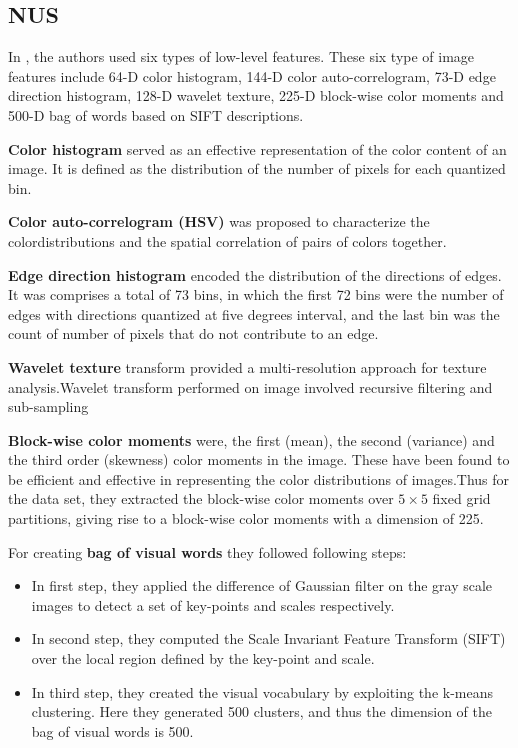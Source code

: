 \subsection{NUS}

In \citet*{NUS}, the authors  used six types of low-level features. These six type of image features include 64-D color 
histogram, 144-D color auto-correlogram, 73-D edge direction histogram, 128-D wavelet texture, 225-D block-wise color moments and 500-D bag of words based on SIFT descriptions. 

\textbf{Color histogram} served as an effective representation of the color content of an image. It is defined as the distribution of the
number of pixels for each quantized bin.

\textbf{Color auto-correlogram (HSV)} was proposed to characterize the colordistributions and the spatial correlation of pairs of colors
together. 

\textbf{Edge direction histogram} encoded the distribution of the directions of edges. It was comprises a total of 73 bins, in which the first 72 bins were the number of edges with directions quantized at five degrees interval, and the last bin was the count of number of pixels that do not contribute to an edge.

\textbf{Wavelet texture} transform provided a multi-resolution approach for texture analysis.Wavelet transform performed on image involved recursive filtering and sub-sampling

\textbf{Block-wise color moments} were, the first (mean), the second (variance) and the third order (skewness)
color moments in the image. These have been found to be efficient and effective in representing the color distributions of images.Thus for the data set, they extracted the block-wise color moments over $5\times5$ fixed grid partitions, giving rise to a block-wise color moments with a dimension of 225.

For creating \textbf{bag of visual words} they followed following steps:
\begin{itemize}
\item In first step, they applied the difference of Gaussian filter on the gray scale images to detect a set of key-points and scales respectively. 
\item In second step, they computed the Scale Invariant Feature Transform (SIFT) over the local region defined by the key-point and scale.
\item In third step, they created the visual vocabulary by exploiting the k-means clustering. Here they generated 500 clusters, and
thus the dimension of the bag of visual words is 500.
\end{itemize}

